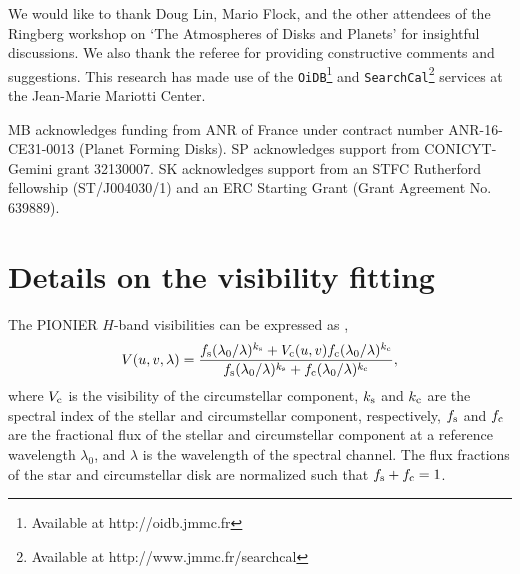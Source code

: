\documentclass[twocolumn,tighten]{aastex61}
\begin{document}
\acknowledgments

We would like to thank Doug Lin, Mario Flock, and the other attendees of the Ringberg workshop on `The Atmospheres of Disks and Planets' for insightful discussions. We also thank the referee for providing constructive comments and suggestions. This research has made use of the \texttt{OiDB}\footnote{Available at http://oidb.jmmc.fr} and \texttt{SearchCal}\footnote{Available at http://www.jmmc.fr/searchcal} services at the Jean-Marie Mariotti Center.

MB acknowledges funding from ANR of France under contract number ANR-16-CE31-0013 (Planet Forming Disks). SP acknowledges support from CONICYT-Gemini grant 32130007. SK acknowledges support from an STFC Rutherford fellowship (ST/J004030/1) and an ERC Starting Grant (Grant Agreement No. 639889).

\vspace{5mm}



\appendix

\section{Details on the visibility fitting}\label{sec:appendix}

The PIONIER $H$-band visibilities can be expressed as \citep{lazareff2017},
\begin{equation}
V(u,v,\lambda) = \frac{f_{\rm s}(\lambda_0/\lambda)^{k_{\rm s}}+V_{\rm c}(u,v)f_{\rm c}(\lambda_0/\lambda)^{k_{\rm c}}}{f_{\rm s}(\lambda_0/\lambda)^{k_{\rm s}}+f_{\rm c}(\lambda_0/\lambda)^{k_{\rm c}}},
\end{equation}
where $V_{\rm c}$ is the visibility of the circumstellar component, $k_{\rm s}$ and $k_{\rm c}$ are the spectral index of the stellar and circumstellar component, respectively, $f_{\rm s}$ and $f_{\rm c}$ are the fractional flux of the stellar and circumstellar component at a reference wavelength $\lambda_0$, and $\lambda$ is the wavelength of the spectral channel. The flux fractions of the star and circumstellar disk are normalized such that $f_{\rm s}+f_{\rm c}=1$.
\end{document}

